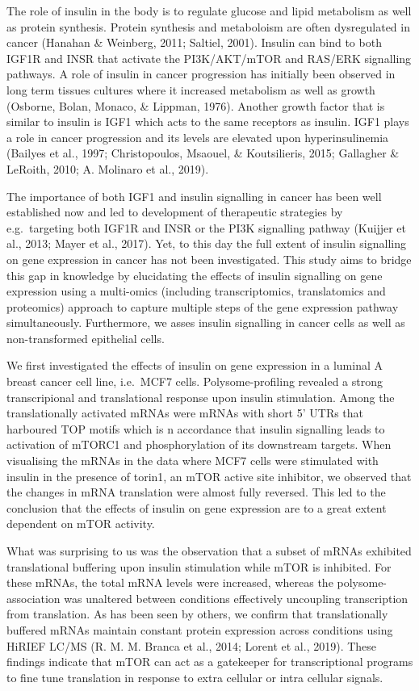\documentclass[12pt,openany]{book}
\begin{document}
The role of insulin in the body is to regulate glucose and lipid
metabolism as well as protein synthesis. Protein synthesis and
metaboloism are often dysregulated in cancer (Hanahan \& Weinberg, 2011;
Saltiel, 2001). Insulin can bind to both IGF1R and INSR that activate
the PI3K/AKT/mTOR and RAS/ERK signalling pathways. A role of insulin in
cancer progression has initially been observed in long term tissues
cultures where it increased metabolism as well as growth (Osborne,
Bolan, Monaco, \& Lippman, 1976). Another growth factor that is similar
to insulin is IGF1 which acts to the same receptors as insulin. IGF1
plays a role in cancer progression and its levels are elevated upon
hyperinsulinemia (Bailyes et al., 1997; Christopoulos, Msaouel, \&
Koutsilieris, 2015; Gallagher \& LeRoith, 2010; A. Molinaro et al.,
2019).

The importance of both IGF1 and insulin signalling in cancer has been
well established now and led to development of therapeutic strategies by
e.g.~targeting both IGF1R and INSR or the PI3K signalling pathway
(Kuijjer et al., 2013; Mayer et al., 2017). Yet, to this day the full
extent of insulin signalling on gene expression in cancer has not been
investigated. This study aims to bridge this gap in knowledge by
elucidating the effects of insulin signalling on gene expression using a
multi-omics (including transcriptomics, translatomics and proteomics)
approach to capture multiple steps of the gene expression pathway
simultaneously. Furthermore, we asses insulin signalling in cancer cells
as well as non-transformed epithelial cells.

We first investigated the effects of insulin on gene expression in a
luminal A breast cancer cell line, i.e.~MCF7 cells. Polysome-profiling
revealed a strong transcripional and translational response upon insulin
stimulation. Among the translationally activated mRNAs were mRNAs with
short 5' UTRs that harboured TOP motifs which is n accordance that
insulin signalling leads to activation of mTORC1 and phosphorylation of
its downstream targets. When visualising the mRNAs in the data where
MCF7 cells were stimulated with insulin in the presence of torin1, an
mTOR active site inhibitor, we observed that the changes in mRNA
translation were almost fully reversed. This led to the conclusion that
the effects of insulin on gene expression are to a great extent
dependent on mTOR activity.

What was surprising to us was the observation that a subset of mRNAs
exhibited translational buffering upon insulin stimulation while mTOR is
inhibited. For these mRNAs, the total mRNA levels were increased,
whereas the polysome-association was unaltered between conditions
effectively uncoupling transcription from translation. As has been seen
by others, we confirm that translationally buffered mRNAs maintain
constant protein expression across conditions using HiRIEF LC/MS (R. M.
M. Branca et al., 2014; Lorent et al., 2019). These findings indicate
that mTOR can act as a gatekeeper for transcriptional programs to fine
tune translation in response to extra cellular or intra cellular
signals.
\end{document}
